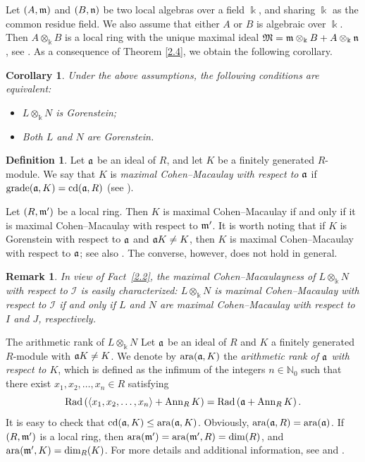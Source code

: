 \documentclass[10pt,a4paper]{amsart}
\makeatletter
\numberwithin{equation}{theorem}
\newtheorem{corollary}[theorem]{Corollary}
\theoremstyle{definition}
\newtheorem{definition}[theorem]{Definition}
\theoremstyle{fact}
\newtheorem{remark}[theorem]{Remark}
\theoremstyle{conjecture}
\newcommand{\grade}{\operatorname{grade}}
\newcommand{\ara}{\operatorname{ara}}
\newcommand{\cd}{\operatorname{cd}}
\newcommand{\Ann}{\operatorname{Ann}}
\newcommand{\Rad}{\operatorname{Rad}}
\newcommand{\fm}{\frak{m}}
\newcommand{\fa}{\frak{a}}
\newcommand{\fn}{\frak{n}}
\def\section{\@startsection{section}{1}%
\z@{.7\linespacing\@plus\linespacing}{.5\linespacing}%
{\normalfont\Large\bfseries\filcenter}}
\makeatother
\begin{document}
Let $(A, \fm)$ and $(B, \fn)$ be two local algebras over a field $\Bbbk$, and sharing $\Bbbk$ as the common residue field.
 We also assume that either $A$ or $B$ is algebraic over $\Bbbk$. Then $A\otimes_\Bbbk B$ is a local ring
  with the unique maximal ideal $\mathfrak{M}= \fm \otimes_\Bbbk B + A \otimes_\Bbbk \fn$, see \cite[Remark 2.8]{R4}.
  As a consequence of Theorem \ref{2.4}, we obtain the following corollary.
 \begin{corollary}
\label{2.5}
Under the above assumptions, the following conditions are equivalent:
 \begin{itemize}
\item[{(a)}] $L\otimes_{\Bbbk} N$ is Gorenstein;
\item[{(b)}] Both $L$ and $N$ are Gorenstein.
\end{itemize}
\end{corollary}
\begin{definition}
\label{2.6}
Let $\fa$ be an ideal of $R$, and let $K$ be a finitely generated $R$-module.
We say that $K$ is \emph{maximal Cohen--Macaulay with respect to $\fa$} if $\grade(\fa, K)=\cd(\fa,R)$ (see \cite{PDR}).
\end{definition}
Let $(R,\fm')$ be a local ring. Then $K$ is maximal Cohen--Macaulay if and only if it is maximal Cohen--Macaulay with respect to $\fm'$.
 It is worth noting that if $K$ is Gorenstein with respect to $\fa$ and $\fa K\neq K$, then $K$ is
 maximal Cohen--Macaulay with respect to $\fa$; see also \cite[Theorem~2.19(c)]{PDR}. The converse, however, does not hold in general.
\begin{remark}
\label{2.7}{\em
In view of Fact~\ref{2.2}, the maximal Cohen--Macaulayness of $L\otimes_{\Bbbk} N$ with respect to $\mathcal{I}$ is easily characterized:
 $L\otimes_{\Bbbk} N$ is maximal Cohen--Macaulay with respect to $\mathcal{I}$ if and only if $L$ and $N$ are maximal Cohen--Macaulay with respect to $I$ and $J$, respectively.}
\end{remark}

\section{The arithmetic rank of $L\otimes_{\Bbbk} N$}
 Let $\fa$ be an ideal of $R$ and $K$ a finitely generated $R$-module with $\fa K\neq K$.
 We denote by $\ara(\fa, K)$ the {\it arithmetic rank of $\fa$ with respect to $K$}, which is defined as the infimum of the integers $n \in \mathbb{N}_0$
 such that there exist $x_1,x_2,\ldots,x_n \in R$ satisfying
\[
\Rad\left(\langle x_1,x_2,\ldots,x_n \rangle + \Ann_R K\right) = \Rad\left(\fa+\Ann_R K\right).
\]
It is easy to check that $\cd(\fa, K)\leq \ara(\fa, K)$. Obviously, $\ara(\fa,R)=\ara(\fa)$. If $(R, \fm')$ is a local
ring, then $\ara(\fm')=\ara(\fm', R)=\dim(R)$, and $\ara(\fm', K)=\dim_R(K)$.
For more details and additional information, see \cite{AR2} and \cite{DGTZ}.
\end{document}

